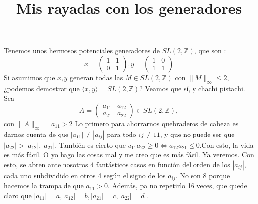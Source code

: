 \documentclass{article}
\title{Mis rayadas con los generadores}
\newcommand\tab[1][0.6cm]{\hspace*{#1}}
\newcommand\nl{\newline\tab}
\begin{document}
	\maketitle
	Tenemos unos hermosos potenciales generadores de $ SL(2, \mathbb{Z}) $, que son : 
	$$
	x = 
	\begin{pmatrix}
	1 & 1 \\
	0 & 1 
	\end{pmatrix},	
	y = 
	\begin{pmatrix}
	1 & 0 \\
	1 & 1 
	\end{pmatrix}
	$$
	\nl
	Si asumimos que $x, y$ generan todas las $M \in SL(2, \mathbb{Z}) $ con  $ \| M \|_\infty \leq 2 $, ¿podemos demostrar que $\langle x, y \rangle =  SL(2, \mathbb{Z})$? \nl
	Veamos que sí, y chachi pistachi. 
	Sea $$
	A = 
	\begin{pmatrix}
	a_{11} & a_{12} \\
	a_{21} & a_{22} 
	\end{pmatrix} \in SL(2, \mathbb{Z}), $$ con  $ \| A \|_\infty = a_{11} > 2
	$ \nl 
	Lo primero para ahorrarnos quebraderos de cabeza es darnos cuenta de que  $|a_{11}| \neq |a_{ij}|$ para todo $ij \neq 11$, y que no puede ser que $ |a_{22}| > |a_{12}|, |a_{21}|$. También es cierto que $a_{11}a_{22}\geq 0 \iff a_{12}a_{21}\leq 0$.\nl Con esto, la vida es más fácil. \nl
	O yo hago las cosas mal y me creo que es más fácil. Ya veremos. \nl
	Con esto, se abren ante nosotros 4 fantásticos casos en función del orden de los $|a_{ij}|$, cada uno subdividido en otros 4 según el signo de los $a_{ij}$. No son 8 porque hacemos la trampa de que $a_{11} > 0$. \nl
	Además, pa no repetirlo 16 veces, que quede claro que  $|a_{11}| = a, |a_{12}| = b, |a_{21}| = c, |a_{22}| = d $	.
\end{document}
